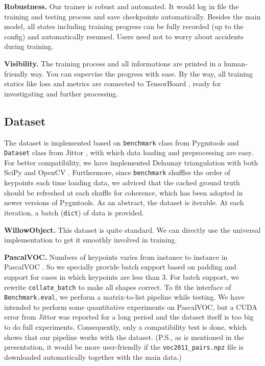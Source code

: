 \documentclass[a4paper]{article}
\begin{document}
\textbf{Robustness.}
Our trainer is robust and automated. It would log in file the training and testing process and save checkpoints automatically. Besides the main model, all states including training progress can be fully recorded (up to the config) and automatically resumed. Users need not to worry about accidents during training.

\textbf{Visibility.}
The training process and all informations are printed in a human-friendly way. You can supervise the progress with ease. By the way, all training statics like loss and metrics are connected to TensorBoard \cite{tensorflow}, ready for investigating and further processing.

\subsection{Dataset}
The dataset is implemented based on \texttt{benchmark} class from Pygmtools \cite{pygmtools} and \texttt{Dataset} class from Jittor \cite{jittor}, with which data loading and preprocessing are easy. For better compatibility, we have implemented Delaunay triangulation with both SciPy \cite{scipy} and OpenCV \cite{opencv}. Furthermore, since \texttt{benchmark} shuffles the order of keypoints each time loading data, we adviced that the cached ground truth should be refreshed at each shuffle for coherence, which has been adopted in newer versions of Pygmtools. As an abstract, the dataset is iterable. At each iteration, a batch (\texttt{dict}) of data is provided.

\textbf{WillowObject.}
This dataset is quite standard. We can directly use the universal implementation to get it smoothly involved in training.

\textbf{PascalVOC.}
Numbers of keypoints varies from instance to instance in PascalVOC \cite{voc1,voc2}. So we specially provide batch support based on padding and support for cases in which keypoints are less than $3$. For batch support, we rewrite \texttt{collate\_batch} to make all shapes correct. To fit the interface of \texttt{Benchmark.eval}, we perform a matrix-to-list pipeline while testing. We have intended to perform some quantitative experiments on PascalVOC, but a CUDA error from Jittor \cite{jittor} was reported for a long period and the dataset itself is too big to do full experiments. Consequently, only a compatibility test is done, which shows that our pipeline works with the dataset. (P.S., as is mentioned in the presentation, it would be more user-friendly if the \texttt{voc2011\_pairs.npz} file is downloaded automatically together with the main data.) 
\end{document}
